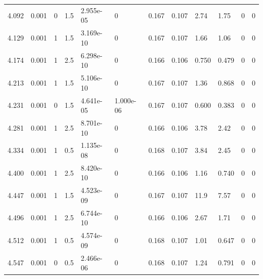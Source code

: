 \documentclass[preview]{standalone}
\begin{document}
{{{\begin{tabular}{L{1.2cm}C{1.2cm} C{0.3cm}C{0.5cm} C{1.4cm}C{1.4cm} C{1.4cm}C{1.4cm} C{1.6cm}C{1.6cm} C{1.6cm}C{1.6cm}}
  4.092  &  0.001  & 0     & 1.5 &  2.955e-05  & 0  &  0.167&   0.107& 2.74 & 1.75   &  0 & 0  \\ 
  4.129  &  0.001  & 1     & 1.5 &  3.169e-10  & 0  &  0.167&   0.107& 1.66 & 1.06   &  0 & 0  \\ 
  4.174  &  0.001  & 1     & 2.5 &  6.298e-10  & 0  &  0.166&   0.106& 0.750 & 0.479   &  0 & 0  \\ 
  4.213  &  0.001  & 1     & 1.5 &  5.106e-10  & 0  &  0.167&   0.107& 1.36 & 0.868   &  0 & 0  \\ 
  4.231  &  0.001  & 0     & 1.5 &  4.641e-05  & 1.000e-06  &  0.167&   0.107& 0.600 & 0.383   &  0 & 0  \\ 
  4.281  &  0.001  & 1     & 2.5 &  8.701e-10  & 0  &  0.166&   0.106& 3.78 & 2.42   &  0 & 0  \\ 
  4.334  &  0.001  & 1     & 0.5 &  1.135e-08  & 0  &  0.168&   0.107& 3.84 & 2.45   &  0 & 0  \\ 
  4.400  &  0.001  & 1     & 2.5 &  8.420e-10  & 0  &  0.166&   0.106& 1.16 & 0.740   &  0 & 0  \\ 
  4.447  &  0.001  & 1     & 1.5 &  4.523e-09  & 0  &  0.167&   0.107& 11.9 & 7.57   &  0 & 0  \\ 
  4.496  &  0.001  & 1     & 2.5 &  6.744e-10  & 0  &  0.166&   0.106& 2.67 & 1.71   &  0 & 0  \\ 
  4.512  &  0.001  & 1     & 0.5 &  4.574e-09  & 0  &  0.168&   0.107& 1.01 & 0.647   &  0 & 0  \\ 
  4.547  &  0.001  & 0     & 0.5 &  2.466e-06  & 0  &  0.168&   0.107& 1.24 & 0.791   &  0 & 0  \\ 
\hline 
\end{tabular} 

}}}
\end{document}
